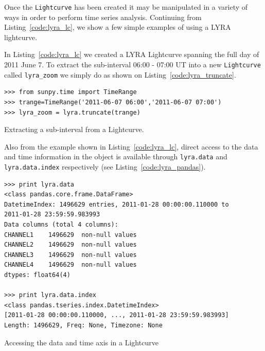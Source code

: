 Once the \texttt{Lightcurve} has been created it may be manipulated in 
a variety of ways in order to perform time series analysis. 
Continuing from Listing~\ref{code:lyra_lc}, we show a few simple 
examples of using a LYRA lightcurve. 

In Listing~\ref{code:lyra_lc} we created a LYRA Lightcurve spanning the 
full day of 2011 June 7. 
To extract the sub-interval 06:00 - 07:00 UT into a new \texttt{Lightcurve} 
called \texttt{lyra\_zoom} we simply do as shown on 
Listing~\ref{code:lyra_truncate}.

\begin{listing}[H]
\begin{verbatim}
>>> from sunpy.time import TimeRange
>>> trange=TimeRange('2011-06-07 06:00','2011-06-07 07:00')
>>> lyra_zoom = lyra.truncate(trange)
\end{verbatim}
\caption{Extracting a sub-interval from a Lightcurve.}
\label{code:lyra_truncate}
\end{listing}

Also from the example shown in Listing~\ref{code:lyra_lc}, direct access to 
the data and time information in the object is available through 
\texttt{lyra.data} and \texttt{lyra.data.index} respectively 
(see Listing~\ref{code:lyra_pandas}).

\begin{listing}[H]
\begin{verbatim}
>>> print lyra.data
<class pandas.core.frame.DataFrame>
DatetimeIndex: 1496629 entries, 2011-01-28 00:00:00.110000 to 
2011-01-28 23:59:59.983993
Data columns (total 4 columns):
CHANNEL1    1496629  non-null values
CHANNEL2    1496629  non-null values
CHANNEL3    1496629  non-null values
CHANNEL4    1496629  non-null values
dtypes: float64(4)

>>> print lyra.data.index
<class pandas.tseries.index.DatetimeIndex>
[2011-01-28 00:00:00.110000, ..., 2011-01-28 23:59:59.983993]
Length: 1496629, Freq: None, Timezone: None
\end{verbatim}
\caption{Accessing the data and time axis in a Lightcurve}
\label{code:lyra_pandas}
\end{listing}

